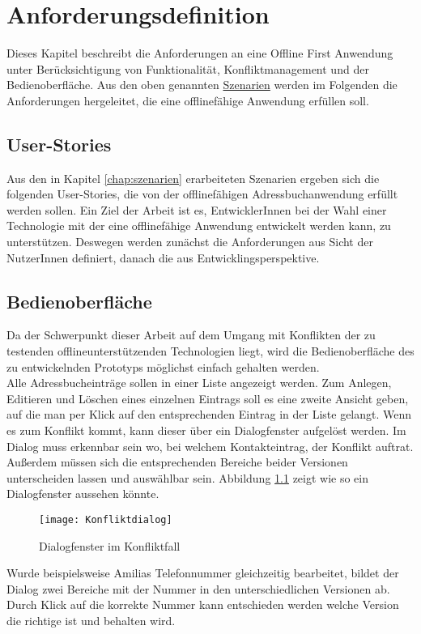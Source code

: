 \chapter{\label{chap:anforderungen}Anforderungsdefinition}
Dieses Kapitel beschreibt die Anforderungen an eine Offline First Anwendung unter Berücksichtigung von Funktionalität, Konfliktmanagement und der Bedienoberfläche.
Aus den oben genannten \hyperref[chap:szenarien]{Szenarien} werden im Folgenden die Anforderungen hergeleitet, die eine offlinefähige Anwendung erfüllen soll.
%
%
\section{User-Stories}
Aus den in Kapitel \ref{chap:szenarien} erarbeiteten Szenarien ergeben sich die folgenden User-Stories, die von der offlinefähigen Adressbuchanwendung erfüllt werden sollen.
Ein Ziel der Arbeit ist es, EntwicklerInnen bei der Wahl einer Technologie mit der eine offlinefähige Anwendung entwickelt werden kann, zu unterstützen.
Deswegen werden zunächst die Anforderungen aus Sicht der NutzerInnen definiert, danach die aus Entwicklingsperspektive.


%
%

%
%
\section{Bedienoberfläche}
Da der Schwerpunkt dieser Arbeit auf dem Umgang mit Konflikten der zu testenden offlineunterstützenden Technologien liegt, wird die Bedienoberfläche des zu entwickelnden Prototyps  möglichst einfach gehalten werden.\\
Alle Adressbucheinträge sollen in einer Liste angezeigt werden. Zum Anlegen, Editieren und Löschen eines einzelnen Eintrags soll es eine zweite Ansicht geben, auf die man per Klick auf den entsprechenden Eintrag in der Liste gelangt.
Wenn es zum Konflikt kommt, kann dieser über ein Dialogfenster aufgelöst werden. Im Dialog muss erkennbar sein wo, bei welchem Kontakteintrag, der Konflikt auftrat.
Außerdem müssen sich die entsprechenden Bereiche beider Versionen unterscheiden lassen und auswählbar sein. Abbildung \ref{fig:dialog} zeigt wie so ein Dialogfenster aussehen könnte.
\begin{figure}[H]
	\centering
	\texttt{[image: Konfliktdialog]}
	\grayRule
	\caption{Dialogfenster im Konfliktfall}
	\label{fig:dialog}
\end{figure}
Wurde beispielsweise Amilias Telefonnummer gleichzeitig bearbeitet, bildet der Dialog zwei Bereiche mit der Nummer in den unterschiedlichen Versionen ab.
Durch Klick auf die korrekte Nummer kann entschieden werden welche Version die richtige ist und behalten wird.